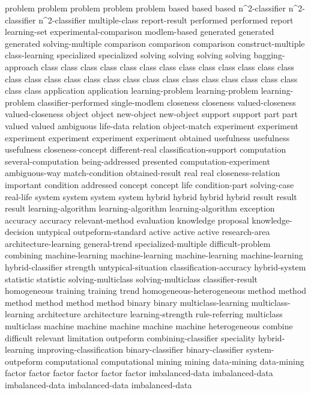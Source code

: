 problem	problem	problem	problem	problem	
based	based	based	
n^2-classifier	n^2-classifier	n^2-classifier	
multiple-class	
report-result	
performed	performed	
report	
learning-set	
experimental-comparison	
modlem-based	
generated	generated	generated	
solving-multiple	
comparison	comparison	comparison	
construct-multiple	
class-learning	
specialized	specialized	
solving	solving	solving	solving	
bagging-approach	
class	class	class	class	class	class	class	class	class	class	class	class	class	class	class	class	class	class	class	class	class	class	class	class	class	class	class	class	class	class	
application	application	
learning-problem	learning-problem	learning-problem	
classifier-performed	
single-modlem	
closeness	closeness	
valued-closeness	valued-closeness	
object	object	
new-object	new-object	
support	support	
part	part	
valued	valued	
ambiguous	
life-data	
relation	
object-match	
experiment	experiment	experiment	experiment	experiment	experiment	
obtained	
usefulness	usefulness	usefulness	
closeness-concept	
different-real	
classification-support	
computation	
several-computation	
being-addressed	
presented	
computation-experiment	
ambiguous-way	
match-condition	
obtained-result	
real	real	
closeness-relation	
important	
condition	
addressed	
concept	concept	
life	
condition-part	
solving-case	
real-life	
system	system	system	system	
hybrid	hybrid	hybrid	hybrid	
result	result	result	
learning-algorithm	learning-algorithm	learning-algorithm	
exception	
accuracy	accuracy	
relevant-method	
evaluation	
knowledge	
proposal	
knowledge-decision	
untypical	
outpeform-standard	
active	active	active	
research-area	
architecture-learning	
general-trend	
specialized-multiple	
difficult-problem	
combining	
machine-learning	machine-learning	machine-learning	machine-learning	
hybrid-classifier	
strength	
untypical-situation	
classification-accuracy	
hybrid-system	
statistic	statistic	
solving-multiclass	solving-multiclass	
classifier-result	
homogeneous	
training	training	
trend	
homogeneous-heterogeneous	
method	method	method	method	method	method	
binary	binary	
multiclass-learning	multiclass-learning	
architecture	architecture	
learning-strength	
rule-referring	
multiclass	multiclass	
machine	machine	machine	machine	machine	
heterogeneous	
combine	
difficult	
relevant	
limitation	
outpeform	
combining-classifier	
speciality	
hybrid-learning	
improving-classification	
binary-classifier	binary-classifier	
system-outpeform	
computational	computational	
mining	mining	
data-mining	data-mining	
factor	factor	factor	factor	factor	factor	
imbalanced-data	imbalanced-data	imbalanced-data	imbalanced-data	imbalanced-data	
